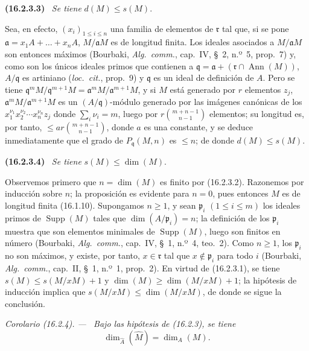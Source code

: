 \documentclass[10pt,oneside]{book}
\makeatletter
\newcommand{\setmanualcurrentlabel}[1]{\def\@currentlabel{#1}}
\newenvironment{env}[1][]{\setmanualcurrentlabel{#1}\par\medskip\noindent\textbf{(#1)}\ }{\par}
\newenvironment{corollary}[1][]{%
  \setmanualcurrentlabel{#1}\par\medskip\noindent\itshape Corolario (#1). ---\ }{\par}
\providecommand{\setmin}{-}%
\makeatother
\begin{document}
\begin{env}[16.2.3.3]
\label{0.16.2.3.3-es}
\emph{Se tiene} $d(M)\leq s(M)$.
\end{env}

Sea, en efecto, $(x_i)_{1\leq i\leq n}$ una familia de elementos de
$\mathfrak{r}$ tal que, si se pone
$\mathfrak{a}=x_1A+\ldots+x_nA$, $M/\mathfrak{a}M$ es de longitud finita.
Los ideales asociados a $M/\mathfrak{a}M$ son entonces máximos (Bourbaki,
\emph{Alg.~comm.}, cap.~IV, \S~2, n.º~5, prop.~7) y, como son los únicos
ideales primos que contienen a
$\mathfrak{q}=\mathfrak{a}+(\mathfrak{r}\cap\operatorname{Ann}(M))$,
$A/\mathfrak{q}$ es artiniano (\emph{loc.~cit.}, prop.~9) y $\mathfrak{q}$ es
un ideal de definición de $A$. Pero se tiene
$\mathfrak{q}^mM/\mathfrak{q}^{m+1}M=
\mathfrak{a}^mM/\mathfrak{a}^{m+1}M$, y si $M$ está generado por $r$ elementos
$z_j$, $\mathfrak{a}^mM/\mathfrak{a}^{m+1}M$ es un
$(A/\mathfrak{q})$-módulo generado por las imágenes canónicas de los
$x_1^{\nu_1}x_2^{\nu_2}\cdots x_n^{\nu_n}z_j$ donde
$\sum_i\nu_i=m$, luego por $r\binom{m+n\setmin 1}{n\setmin 1}$ elementos; su longitud es,
por tanto, $\leq ar\binom{m+n\setmin 1}{n\setmin 1}$, donde $a$ es una constante, y se
deduce inmediatamente que el grado de $P_{\mathfrak{q}}(M,n)$ es $\leq n$;
de donde $d(M)\leq s(M)$.

\begin{env}[16.2.3.4]
\label{0.16.2.3.4-es}
\emph{Se tiene} $s(M)\leq\dim(M)$.
\end{env}

Observemos primero que $n=\dim(M)$ es finito por (16.2.3.2). Razonemos por
inducción sobre $n$; la proposición es evidente para $n=0$, pues entonces $M$
es de longitud finita (16.1.10). Supongamos $n\geq1$, y sean
$\mathfrak{p}_i$ $(1\leq i\leq m)$ los ideales primos de
$\operatorname{Supp}(M)$ tales que $\dim(A/\mathfrak{p}_i)=n$; la definición
de los $\mathfrak{p}_i$ muestra que son elementos minimales de
$\operatorname{Supp}(M)$, luego son finitos en número (Bourbaki,
\emph{Alg.~comm.}, cap.~IV, \S~1, n.º~4, teo.~2). Como $n\geq1$, los
$\mathfrak{p}_i$ no son máximos, y existe, por tanto,
$x\in\mathfrak{r}$ tal que $x\notin\mathfrak{p}_i$ para todo $i$ (Bourbaki,
\emph{Alg.~comm.}, cap.~II, \S~1, n.º~1, prop.~2). En virtud de (16.2.3.1),
se tiene $s(M)\leq s(M/xM)+1$ y $\dim(M)\geq\dim(M/xM)+1$; la hipótesis de
inducción implica que $s(M/xM)\leq\dim(M/xM)$, de donde se sigue la conclusión.

\begin{corollary}[16.2.4]
\label{0.16.2.4-es}
Bajo las hipótesis de \textup{(16.2.3)}, se tiene
\begin{equation}
\label{0.16.2.4.1-es}
\tag{16.2.4.1}
  \dim_{\widehat{A}}(\widehat{M})=\dim_A(M).
\end{equation}
\end{corollary}
\end{document}
